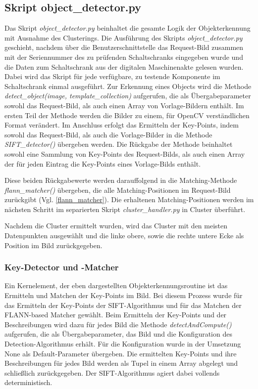 \documentclass[
    type=Projektarbeit,
    status=draft, %
    language=german, %
    bibengine=bibtex,
]{unibwm-inf-thesis}
\begin{document}
    \subsection{Skript object\_detector.py}
    Das Skript \textit{object\_detector.py} beinhaltet die gesamte Logik der Objekterkennung mit Ausnahme des Clusterings.
    Die Ausführung des Skripts \textit{object\_detector.py} geschieht, nachdem über die Benutzerschnittstelle das Request-Bild zusammen mit der Seriennummer des zu prüfenden Schaltschranks eingegeben wurde und die Daten zum Schaltschrank aus der digitalen Maschinenakte gelesen wurden.
    Dabei wird das Skript für jede verfügbare, zu testende Komponente im Schaltschrank einmal ausgeführt.
    Zur Erkennung eines Objects wird die Methode \textit{detect\_object(image, template\_collection)} aufgerufen, die als Übergabeparameter sowohl das Request-Bild, als auch einen Array von Vorlage-Bildern enthält.
    Im ersten Teil der Methode werden die Bilder zu einem, für OpenCV verständlichen Format verändert.
    Im Anschluss erfolgt das Ermitteln der Key-Points, indem sowohl das Request-Bild, als auch die Vorlage-Bilder in die Methode \textit{SIFT\_detector()} übergeben werden.
    Die Rückgabe der Methode beinhaltet sowohl eine Sammlung von Key-Points des Request-Bilds, als auch einen Array der für jeden Eintrag die Key-Points eines Vorlage-Bilds enthält.

    Diese beiden Rückgabewerte werden darauffolgend in die Matching-Methode \textit{flann\_matcher()} übergeben, die alle Matching-Positionen im Request-Bild zurückgibt (Vgl. \autoref{flann_matcher}).
    Die erhaltenen Matching-Positionen werden im nächsten Schritt im separierten Skript \textit{cluster\_handler.py} in Cluster überführt.

    Nachdem die Cluster ermittelt wurden, wird das Cluster mit den meisten Datenpunkten ausgewählt und die linke obere, sowie die rechte untere Ecke als Position im Bild zurückgegeben.


    \subsubsection{Key-Detector und -Matcher}
    Ein Kernelement, der eben dargestellten Objekterkennungsroutine ist das Ermitteln und Matchen der Key-Points im Bild.
    Bei diesem Prozess wurde für das Ermitteln der Key-Points der SIFT-Algorithmus und für das Matchen der FLANN-based Matcher gewählt.
    Beim Ermitteln der Key-Points und der Beschreibungen wird dazu für jedes Bild die Methode \textit{detectAndCompute()} aufgerufen, die als Übergabeparameter, das Bild und die Konfiguration des Detection-Algorithmus erhält.
    Für die Konfiguration wurde in der Umsetzung None als Default-Parameter übergeben.
    Die ermittelten Key-Points und ihre Beschreibungen für jedes Bild werden als Tupel in einem Array abgelegt und schließlich zurückgegeben.
    Der SIFT-Algorithmus agiert dabei vollends deterministisch.
\end{document}
